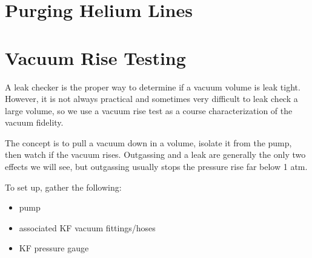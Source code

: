 \section{Purging Helium Lines}

\section{Vacuum Rise Testing}

A leak checker is the proper way to determine if a vacuum volume is leak tight.  However, it is not always practical and sometimes very difficult to leak check a large volume, so we use a vacuum rise test as a course characterization of the vacuum fidelity.


The concept is to pull a vacuum down in a volume, isolate it from the pump, then watch if the vacuum rises.  Outgassing and a leak are generally the only two effects we will see, but outgassing usually stops the pressure rise far below 1 atm.

To set up, gather the following:
\begin{itemize}
 \item pump 
 \item associated KF vacuum fittings/hoses
 \item KF pressure gauge
\end{itemize}


